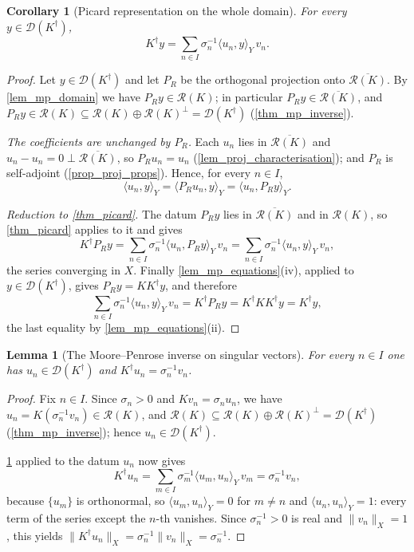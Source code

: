\documentclass[a4paper]{report}
\theoremstyle{plain}
\newtheorem{lemma}[theorem]{Lemma}
\newtheorem{corollary}[theorem]{Corollary}
\theoremstyle{definition}
\theoremstyle{remark}
\newcommand{\Ran}{\mathcal{R}}
\newcommand{\Dom}{\mathcal{D}}
\newcommand{\dg}{^{\dagger}}
\begin{document}
\begin{corollary}[Picard representation on the whole domain]
  \label{cor_picard_domain}
  For every $y \in \Dom(K\dg)$,
  \[
    K\dg y = \sum_{n \in I} \sigma_n^{-1}\langle u_n, y\rangle_Y\, v_n .
  \]
\end{corollary}

\begin{proof}
  Let $y \in \Dom(K\dg)$ and let $P_R$ be the orthogonal projection onto
  $\overline{\Ran(K)}$.  By \cref{lem_mp_domain} we have $P_R y \in \Ran(K)$; in
  particular $P_R y \in \overline{\Ran(K)}$, and
  $P_R y \in \Ran(K) \subseteq \Ran(K) \oplus \Ran(K)^{\perp} = \Dom(K\dg)$
  (\cref{thm_mp_inverse}).

  \emph{The coefficients are unchanged by $P_R$.}  Each $u_n$ lies in
  $\overline{\Ran(K)}$ and $u_n - u_n = 0 \perp \overline{\Ran(K)}$, so $P_R u_n = u_n$
  (\cref{lem_proj_characterisation}); and $P_R$ is self-adjoint (\cref{prop_proj_props}).
  Hence, for every $n \in I$,
  \[
    \langle u_n, y\rangle_Y = \langle P_R u_n, y\rangle_Y
      = \langle u_n, P_R y\rangle_Y .
  \]

  \emph{Reduction to \cref{thm_picard}.}  The datum $P_R y$ lies in
  $\overline{\Ran(K)}$ and in $\Ran(K)$, so \cref{thm_picard} applies to it and gives
  \[
    K\dg P_R y = \sum_{n \in I}\sigma_n^{-1}\langle u_n, P_R y\rangle_Y\, v_n
      = \sum_{n \in I}\sigma_n^{-1}\langle u_n, y\rangle_Y\, v_n ,
  \]
  the series converging in $X$.  Finally \cref{lem_mp_equations}(iv), applied to
  $y \in \Dom(K\dg)$, gives $P_R y = KK\dg y$, and therefore
  \[
    \sum_{n \in I}\sigma_n^{-1}\langle u_n, y\rangle_Y\, v_n
      = K\dg P_R y = K\dg K K\dg y = K\dg y ,
  \]
  the last equality by \cref{lem_mp_equations}(ii).
\end{proof}


\begin{lemma}[The Moore--Penrose inverse on singular vectors]
  \label{lem_mp_singular_vector}
  For every $n \in I$ one has $u_n \in \Dom(K\dg)$ and $K\dg u_n = \sigma_n^{-1} v_n$.
\end{lemma}

\begin{proof}
  Fix $n \in I$.  Since $\sigma_n > 0$ and $Kv_n = \sigma_n u_n$, we have
  $u_n = K(\sigma_n^{-1}v_n) \in \Ran(K)$, and
  $\Ran(K) \subseteq \Ran(K) \oplus \Ran(K)^{\perp} = \Dom(K\dg)$
  (\cref{thm_mp_inverse}); hence $u_n \in \Dom(K\dg)$.

  \cref{cor_picard_domain} applied to the datum $u_n$ now gives
  \[
    K\dg u_n = \sum_{m \in I}\sigma_m^{-1}\langle u_m, u_n\rangle_Y\, v_m
      = \sigma_n^{-1} v_n ,
  \]
  because $\{u_m\}$ is orthonormal, so $\langle u_m, u_n\rangle_Y = 0$ for $m \ne n$ and
  $\langle u_n, u_n\rangle_Y = 1$: every term of the series except the $n$-th vanishes.
  Since $\sigma_n^{-1} > 0$ is real and $\|v_n\|_X = 1$, this yields
  $\|K\dg u_n\|_X = \sigma_n^{-1}\|v_n\|_X = \sigma_n^{-1}$.
\end{proof}
\end{document}
